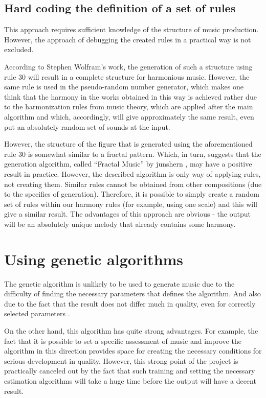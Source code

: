 \documentclass[thesis=B,english]{FITthesis}[2019/12/23]
\begin{document}
\subsection{Hard coding the definition of a set of rules}

This approach requires sufficient knowledge of the structure of music production. However, the approach of debugging the created rules in a practical way is not excluded.

According to Stephen Wolfram's work, the generation of such a structure using rule 30 will result in a complete structure for harmonious music. However, the same rule is used in the pseudo-random number generator, which makes one think that the harmony in the works obtained in this way is achieved rather due to the harmonization rules from music theory, which are applied after the main algorithm and which, accordingly, will give approximately the same result, even put an absolutely random set of sounds at the input.

However, the structure of the figure that is generated using the aforementioned rule 30 is somewhat similar to a fractal pattern. Which, in turn, suggests that the generation algorithm, called “Fractal Music” by junshern \cite{junshern_github}, may have a positive result in practice. However, the described algorithm is only way of applying rules, not creating them. Similar rules cannot be obtained from other compositions (due to the specifics of generation). Therefore, it is possible to simply create a random set of rules within our harmony rules (for example, using one scale) and this will give a similar result. The advantages of this approach are obvious - the output will be an absolutely unique melody that already contains some harmony.

\section{Using genetic algorithms}

The genetic algorithm is unlikely to be used to generate music due to the difficulty of finding the necessary parameters that defines the algorithm. And also due to the fact that the result does not differ much in quality, even for correctly selected parameters \cite{junshern_github,genetic_for_composing}.

On the other hand, this algorithm has quite strong advantages. For example, the fact that it is possible to set a specific assessment of music and improve the algorithm in this direction provides space for creating the necessary conditions for serious development in quality. However, this strong point of the project is practically canceled out by the fact that such training and setting the necessary estimation algorithms will take a huge time before the output will have a decent result.
\end{document}
